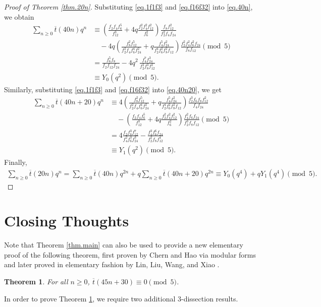 \documentclass{amsart}
\newtheorem{theorem}{Theorem}[section]
\theoremstyle{definition}
\newcommand{\tbar}{\overline{t}}
\begin{document}
\begin{proof}[Proof of Theorem \ref{thm.20n}]
Substituting \eqref{eq.1f1f3} and \eqref{eq.f16f32} into \eqref{eq.40n}, we obtain
\begin{align*}
    \sum_{n\ge0}\tbar(40n)q^{n}
&\equiv\left(\frac{f_2f_4f_6^{5}}{f_{12}^{3}}
+4q\frac{f_2^2f_4^2f_{12}^2}{f_6^2}\right)\frac{f_8f_{12}^{2}}{f_2^{2}f_4f_{24}}\\
&\quad -4q\left(\frac{f_8^{2}f_{12}^{5}}{f_2^{2}f_4f_6^{4}f_{24}^{2}}
+q\frac{f_4^{5}f_{24}^{2}}{f_2^{4}f_6^{2}f_8^{2}f_{12}}\right)\frac{f_2^{2}f_4^{2}f_6^{2}f_{24}}{f_8f_{12}} \pmod 5\\
&=\frac{f_6^{5}f_8}{f_2f_{12}f_{24}}
-4q^{2}\,\frac{f_4^{7}f_{24}^{3}}{f_2^{2}f_8^{3}f_{12}^{2}}\\
&\equiv Y_0(q^2) \pmod 5.
\end{align*}
Similarly, substituting \eqref{eq.1f1f3} and \eqref{eq.f16f32} into \eqref{eq.40n20}, we get
\begin{align*}
    \sum_{n\ge0}\tbar(40n+20)q^{n}
&\equiv4\left(\frac{f_8^{2}f_{12}^{5}}{f_2^{2}f_4f_6^{4}f_{24}^{2}}
+q\frac{f_4^{5}f_{24}^{2}}{f_2^{4}f_6^{2}f_8^{2}f_{12}}\right)\frac{f_2^{3}f_6f_8f_{12}^{2}}{f_4f_{24}}\\
&\quad -\left(\frac{f_2f_4f_6^{5}}{f_{12}^{3}}
+4q\frac{f_2^2f_4^2f_{12}^2}{f_6^2}\right)\frac{f_4^{2}f_6f_{24}}{f_2^{3}f_8f_{12}}
\pmod5\\
&=4\frac{f_2f_8^{3}f_{12}^{7}}{f_4^{2}f_6^{3}f_{24}^{3}}
-\frac{f_4^{3}f_6^{6}f_{24}}{f_2^{2}f_8f_{12}^{4}}\\
&\equiv Y_1(q^2) \pmod 5.
\end{align*}
Finally, 
\begin{align*}
\sum_{n\ge0}\tbar(20n)q^{n}
=\sum_{n\ge0}\tbar(40n)q^{2n}+q\sum_{n\ge0}\tbar(40n+20)q^{2n}
\equiv Y_0(q^{4})+qY_1(q^{4})\pmod5. 
\end{align*}
\end{proof}

\section{Closing Thoughts}\label{sec.ct}
Note that Theorem \ref{thm.main} can also be used to provide a new elementary proof of the following theorem, first proven by Chern and Hao \cite{CH2019} via modular forms and later proved in elementary fashion by Lin, Liu, Wang, and Xiao \cite{LLWX}.  

\begin{theorem}
\label{thm:45n30}
For all $n\geq 0$, $\tbar(45n+30) \equiv 0 \pmod{5}$.  
\end{theorem}
In order to prove Theorem \ref{thm:45n30}, we require two additional 3-dissection results. 
\end{document}
